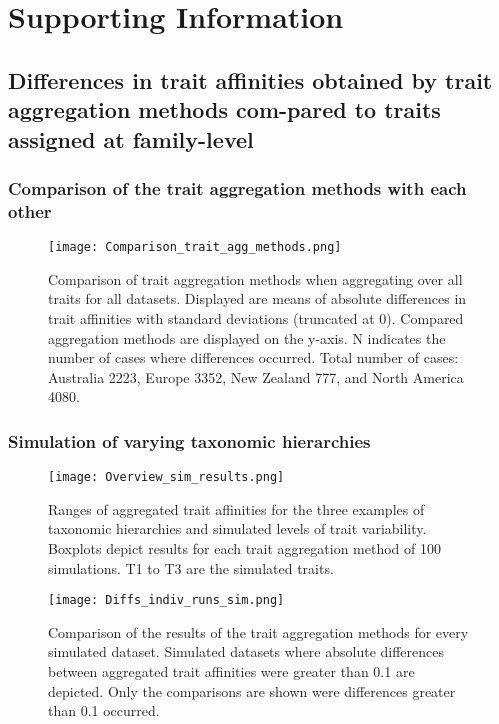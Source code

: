 \documentclass[../Draft_harmonization_paper.tex]{subfiles}
\begin{document}
\section*{Supporting Information}
\label{sec:SI}

\subsection*{Differences in trait affinities obtained by trait aggregation methods com-pared to traits assigned at family-level}

\subsubsection*{Comparison of the trait aggregation methods with each other}
\label{sec:compa_aggr_methods}

\begin{figure}[H]
    \centering
    \texttt{[image: Comparison\_trait\_agg\_methods.png]}
    \caption{Comparison of trait aggregation methods when aggregating over all traits for all datasets. Displayed are means of absolute differences in trait affinities with standard deviations (truncated at 0). Compared aggregation methods are displayed on the y-axis. N indicates the number of cases where differences occurred. Total number of cases: Australia 2223, Europe 3352, New Zealand 777, and North America 4080.}
    \label{fig:comp_aggr_methods}
\end{figure}

\subsubsection*{Simulation of varying taxonomic hierarchies}

\begin{figure}[H]
    \centering
    \texttt{[image: Overview\_sim\_results.png]}
    \caption{Ranges of aggregated trait affinities for the three examples of taxonomic hierarchies and simulated levels of trait variability. Boxplots depict results for each trait aggregation method of 100 simulations. T1 to T3 are the simulated traits.}
    \label{fig:overview_sim_results}
\end{figure}

\begin{figure}[H]
    \centering
    \texttt{[image: Diffs\_indiv\_runs\_sim.png]}
    \caption{Comparison of the results of the trait aggregation methods for every simulated dataset. Simulated datasets where absolute differences between aggregated trait affinities were greater than 0.1 are depicted. Only the comparisons are shown were differences greater than 0.1 occurred.}
    \label{fig:sim_indv_runs}
\end{figure}
\end{document}
